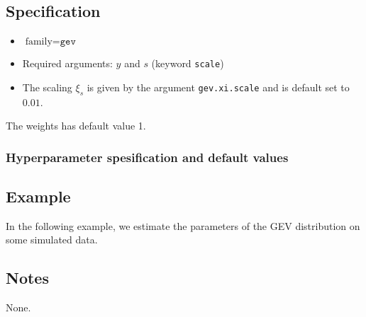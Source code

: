 \documentclass[a4paper,11pt]{article}
\begin{document}
\subsection*{Specification}

\begin{itemize}
\item $\text{family}=\texttt{gev}$
\item Required arguments: $y$ and $s$ (keyword \texttt{scale})
\item The scaling $\xi_{s}$ is given by the argument
    \texttt{gev.xi.scale} and is default set to $0.01$.
\end{itemize}
The weights has default value 1.

\subsubsection*{Hyperparameter spesification and default values}


\subsection*{Example}

In the following example, we estimate the parameters of the GEV
distribution on some simulated data.


\subsection*{Notes}

None.
\end{document}
